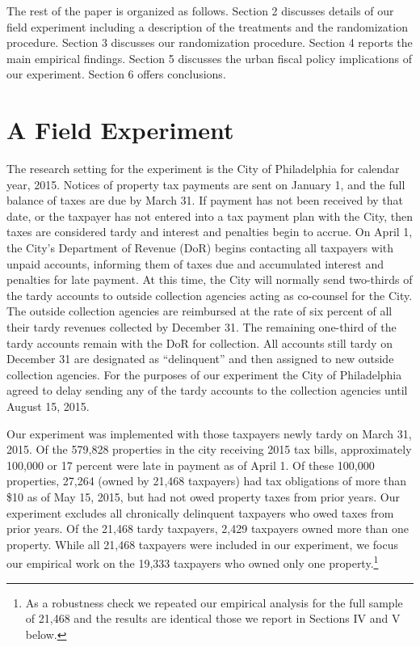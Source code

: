 \documentclass[12pt]{article}
\begin{document}
The rest of the paper is organized as follows. Section 2 discusses details
of our field experiment including a description of the
treatments and the randomization procedure. Section 3 discusses our
randomization procedure.  Section 4 reports the main empirical
findings. Section 5 discusses the urban fiscal policy implications of
our experiment. Section 6 offers conclusions.


\section{A Field Experiment }

The research setting for the experiment is the City of Philadelphia
for calendar year, 2015.  Notices of property tax payments are sent on
January 1, and the full balance of taxes are due by March 31.  If
payment has not been received by that date, or the taxpayer has not
entered into a tax payment plan with the City, then taxes are
considered tardy and interest and penalties begin to accrue.  On April
1, the City's Department of Revenue (DoR) begins contacting all
taxpayers with unpaid accounts, informing them of taxes due and
accumulated interest and penalties for late payment.  At this time,
the City will normally send two-thirds of the tardy accounts to
outside collection agencies acting as co-counsel for the City. The
outside collection agencies are reimbursed at the rate of six percent
of all their tardy revenues collected by December 31. The remaining
one-third of the tardy accounts remain with the DoR for
collection. All accounts still tardy on December 31 are designated as
``delinquent'' and then assigned to new outside collection
agencies. For the purposes of our experiment the City of Philadelphia
agreed to delay sending any of the tardy accounts to the collection
agencies until August 15, 2015.

Our experiment was implemented with those taxpayers newly tardy on
March 31, 2015. Of the 579,828 properties in the city receiving 2015
tax bills, approximately 100,000 or 17 percent were late in payment as
of April 1. Of these 100,000 properties, 27,264 (owned by 21,468
taxpayers) had tax obligations of more than \$10 as of May 15, 2015,
but had not owed property taxes from prior years. Our experiment
excludes all chronically delinquent taxpayers who owed taxes from
prior years. Of the 21,468 tardy taxpayers, 2,429 taxpayers owned more
than one property. While all 21,468 taxpayers were included in our
experiment, we focus our empirical work on the 19,333 taxpayers who
owned only one property.\footnote{As a robustness check we repeated
  our empirical analysis for the full sample of 21,468 and the results
  are identical those we report in Sections IV and V below. }
\end{document}
